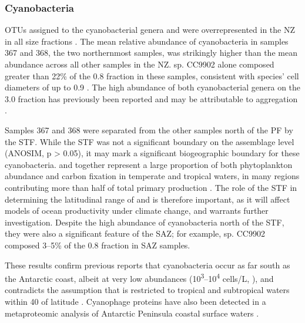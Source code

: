 \subsubsection{Cyanobacteria}

\acp{OTU} assigned to the cyanobacterial genera  and  were overrepresented in the \ac{NZ} in all size fractions .
The mean relative abundance of cyanobacteria in samples 367 and 368, the two northernmost samples, was strikingly higher than the mean abundance across all other samples in the \ac{NZ}.
 sp. CC9902 alone composed greater than 22\% of the 0.8 \micron{} fraction in these samples, consistent with  species' cell diameters of up to 0.9 \micron \cite{Waterbury:1985js}.
The high abundance of both cyanobacterial genera on the 3.0 \micron{} fraction has previously been reported \cite{Lauro:2010jna} and may be attributable to aggregation \cite{Lomas:2011bp}.

Samples 367 and 368 were separated from the other samples north of the \ac{PF} by the \ac{STF}.
While the \ac{STF} was not a significant boundary on the assemblage level (ANOSIM, p > 0.05), it may mark a significant biogeographic boundary for these cyanobacteria.
 and  together represent a large proportion of both phytoplankton abundance and carbon fixation in temperate and tropical waters, in many regions contributing more than half of total primary production \cite{Liu:1997ub,Liu:1998tk,Andre:1999uh}.
The role of the \ac{STF} in determining the latitudinal range of  and  is therefore important, as it will affect models of ocean productivity under climate change, and warrants further investigation.
Despite the high abundance of cyanobacteria north of the \ac{STF}, they were also a significant feature of the \ac{SAZ}; for example,  sp. CC9902 composed 3--5\% of the 0.8 \micron{} fraction in \ac{SAZ} samples.

These results confirm previous reports \cite{Marchant:1987wv,Ghiglione:2011ee} that cyanobacteria occur as far south as the Antarctic coast, albeit at very low abundances (10\textsuperscript{3}--10\textsuperscript{4} cells/L, \citet{Marchant:1987wv}), and contradicts the assumption that  is restricted to tropical and subtropical waters within 40\textdegree{} of latitude \cite{Partensky:1999uf}.
Cyanophage proteins have also been detected in a metaproteomic analysis of Antarctic Peninsula coastal surface waters \cite{Williams:2012bs}.


